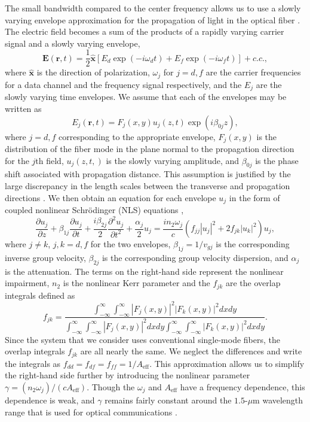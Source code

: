 The small bandwidth compared to the center frequency allows us to use a slowly varying envelope approximation for the propagation of light in the optical fiber \cite{Agrawal2013}. The electric field becomes a sum of the products of a rapidly varying carrier signal and a slowly varying envelope,
%
\begin{equation}
\mathbf{E}(\mathbf{r}, t) = \frac{1}{2}\hat{\mathbf{x}}\left[ E_d\exp(-i\omega_dt) + E_f\exp(-i\omega_ft)\right] + c.c.,
\end{equation}
%
where $\hat{\mathbf{x}}$ is the direction of polarization, $\omega_j$ for $j=d,f$ are the carrier frequencies for a data channel and the frequency signal respectively, and the $E_j$ are the slowly varying time envelopes. We assume that each of the envelopes may be written as
%
\begin{equation}
E_j(\mathbf{r}, t) = F_j(x,y)u_j(z,t)\exp(i\beta_{0j}z),
\end{equation}
%
where $j=d,f$ corresponding to the appropriate envelope, $F_j(x,y)$ is the distribution of the fiber mode in the plane normal to the propagation direction for the $j$th field, $u_j(z,t,)$ is the slowly varying amplitude, and $\beta_{0j}$ is the phase shift associated with propagation distance. This assumption is justified by the large discrepancy in the length scales between the transverse and propagation directions \cite{Agrawal2013}. We then obtain an equation for each envelope $u_j$ in the form of coupled nonlinear Schr{\"o}dinger (NLS) equations \cite{Agrawal2013},
%
\begin{equation}
\frac{\partial u_j}{\partial z} + \beta_{1j}\frac{\partial u_j}{\partial t} + \frac{i\beta_{2j}}{2}\frac{\partial^2 u_j}{\partial t^2} + \frac{\alpha_j}{2}u_j = \frac{in_2\omega_j}{c}\left(f_{jj}|u_j|^2 + 2f_{jk}|u_k|^2\right)u_j,
\end{equation}
%
where $j\neq k$, $j,k = d,f$ for the two envelopes, $\beta_{1j} = 1/v_{gj}$ is the corresponding inverse group velocity, $\beta_{2j}$ is the corresponding group velocity dispersion, and $\alpha_j$ is the attenuation. The terms on the right-hand side represent the nonlinear impairment, $n_2$ is the nonlinear Kerr parameter and the $f_{jk}$ are the overlap integrals defined as
%
\begin{equation}
f_{jk} = \frac{\int_{-\infty}^{\infty}\int_{-\infty}^{\infty} |F_j(x,y)|^2|F_k(x,y)|^2dxdy }{\int_{-\infty}^{\infty}\int_{-\infty}^{\infty} |F_j(x,y)|^2dxdy\int_{-\infty}^{\infty}\int_{-\infty}^{\infty}|F_k(x,y)|^2dxdy}.
\end{equation}
%
Since the system that we consider uses conventional single-mode fibers, the overlap integrals $f_{jk}$ are all nearly the same. We neglect the differences and write the integrals as $f_{dd} = f_{df} = f_{ff} = 1/A_{\text{eff}}$. This approximation allows us to simplify the right-hand side further by introducing the nonlinear parameter $\gamma = (n_2\omega_j)/(cA_{\text{eff}})$. Though the $\omega_j$ and $A_{\text{eff}}$ have a frequency dependence, this dependence is weak, and $\gamma$ remains fairly constant around the $1.5$-$\mu$m wavelength range that is used for optical communications \cite{Agrawal2013}.

